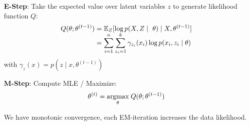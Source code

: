 \textbf{E-Step}: Take the expected value over latent variables $z$ to generate likelihood function $Q$:
\begin{align*}
	Q(\theta ; \theta^{(t-1)}) &= \E_{Z}[ \log  p(X, Z \; | \; \theta) \; | \; X, \theta^{(t-1)}] \\[-5pt]
	&= \sum_{i=1}^n \sum_{z_i=1}^k \gamma_{z_i}(x_i) \log p(x_i, z_i \; | \; \theta)
\end{align*}
with $\gamma_z(x) = p(z \; | \; x, \theta^{(t-1)})$

\textbf{M-Step}: Compute MLE / Maximize:
$$\theta^{(t)} = \underset{\theta}{\text{argmax}} \; Q(\theta; \theta^{(t-1)})$$

We have monotonic convergence, each EM-iteration increases the data likelihood.
